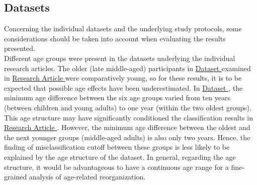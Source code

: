 \subsection{Datasets}
Concerning the individual datasets and the underlying study protocols, some considerations should be taken into account when evaluating the results presented.\\
Different age groups were present in the datasets underlying the individual research articles. The older (late middle-aged) participants in \hyperref[methods:datasets:I]{Dataset } examined in \hyperref[results:paperI]{Research Article } were comparatively young, so for these results, it is to be expected that possible age effects have been underestimated. In \hyperref[methods:datasets:II]{Dataset }, the minimum age difference between the six age groups varied from ten years (between children and young adults) to one year (within the two oldest groups). This age structure may have significantly conditioned the classification results in \hyperref[results:paperII]{Research Article }. However, the minimum age difference between the oldest and the next younger groups (middle-aged adults) is also only two years. Hence, the finding of misclassification cutoff between these groups is less likely to be explained by the age structure of the dataset. In general, regarding the age structure, it would be advantageous to have a continuous age range for a fine-grained analysis of age-related reorganization.\\
